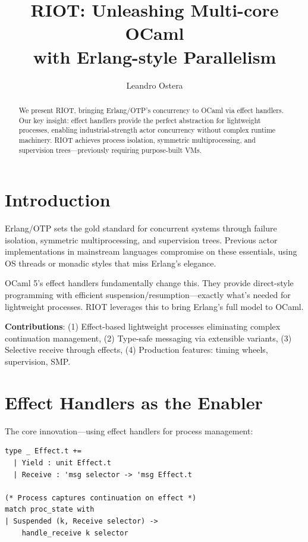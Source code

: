 \documentclass[sigplan,10pt]{acmart}
\begin{document}
\title{RIOT: Unleashing Multi-core OCaml\\with Erlang-style Parallelism}
\author{Leandro Ostera}

\begin{abstract}
We present RIOT, bringing Erlang/OTP's concurrency to OCaml via effect handlers. Our key insight: effect handlers provide the perfect abstraction for lightweight processes, enabling industrial-strength actor concurrency without complex runtime machinery. RIOT achieves process isolation, symmetric multiprocessing, and supervision trees—previously requiring purpose-built VMs. 
\end{abstract}

\maketitle

\section{Introduction}
Erlang/OTP sets the gold standard for concurrent systems through failure isolation, symmetric multiprocessing, and supervision trees. Previous actor implementations in mainstream languages compromise on these essentials, using OS threads or monadic styles that miss Erlang's elegance.

OCaml 5's effect handlers fundamentally change this. They provide direct-style programming with efficient suspension/resumption—exactly what's needed for lightweight processes. RIOT leverages this to bring Erlang's full model to OCaml.

\textbf{Contributions}: (1) Effect-based lightweight processes eliminating complex continuation management, (2) Type-safe messaging via extensible variants, (3) Selective receive through effects, (4) Production features: timing wheels, supervision, SMP.

\section{Effect Handlers as the Enabler}
The core innovation—using effect handlers for process management:

\begin{lstlisting}
type _ Effect.t += 
  | Yield : unit Effect.t
  | Receive : 'msg selector -> 'msg Effect.t

(* Process captures continuation on effect *)
match proc_state with
| Suspended (k, Receive selector) ->
    handle_receive k selector
\end{lstlisting}
\end{document}
